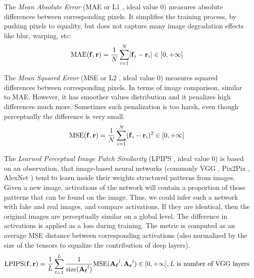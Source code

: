 The \textit{Mean Absolute Error} (MAE or L1 \cite{metric:l1-95}, ideal value 0) measures absolute differences between corresponding pixels. It simplifies the training process, by pushing pixels to equality, but does not capture many image degradation effects like blur, warping, etc: 
\begin{equation}
	\setlength\abovedisplayskip{2pt}\text{MAE}(\bmr{f}, \bmr{r}) = \frac{1}{N}\sum_{i=1}^{N}\lvert \bmr{f}_i - \bmr{r}_i \rvert \in [0, +\infty]\setlength\belowdisplayskip{2pt}
\end{equation}

The \textit{Mean Squared Error} (MSE or L2 \cite{metric:l1-95}, ideal value 0) measures squared differences between corresponding pixels. In terms of image comparison, similar to MAE. However, it has smoother values distribution and it penalizes high differences much more. Sometimes such penalization is too harsh, even though perceptually the difference is very small. 
\begin{equation}
	\setlength\abovedisplayskip{2pt}\text{MSE}(\bmr{f}, \bmr{r}) = \frac{1}{N}\sum_{i=1}^{N}(\bmr{f}_i - \bmr{r}_i)^2 \in [0, +\infty]\setlength\belowdisplayskip{2pt}
\end{equation} 

The \textit{Learned Perceptual Image Patch Similarity} (LPIPS \cite{metric:lpips18}, ideal value 0) is based on an observation, that image-based neural networks (commonly VGG \cite{dnn:vgg14}, Pix2Pix \cite{dnn:pix2pix17}, AlexNet \cite{dnn:alexnet12}) tend to learn inside their weights structured patterns from images. Given a new image, activations of the network will contain a proportion of those patterns that can be found on the image. Thus, we could infer such a network with fake and real images, and compare activations. If they are identical, then the original images are perceptually similar on a global level. The difference in activations is applied as a loss during training. The metric is computed as an average MSE distance between corresponding activations (also normalized by the size of the tensors to equalize the contribution of deep layers).
\begin{equation}
	\setlength\abovedisplayskip{0pt} 
	\text{LPIPS}(\bmr{f}, \bmr{r}) = \frac{1}{L}\sum_{l=1}^L \frac{1}{\text{size}(\bmr{A_f}^l)}\text{MSE}(\bmr{A_f}^l, \bmr{A_r}^l) \in [0, +\infty], L \text{ is number of VGG layers} \setlength\belowdisplayskip{0pt}
\end{equation}
	
